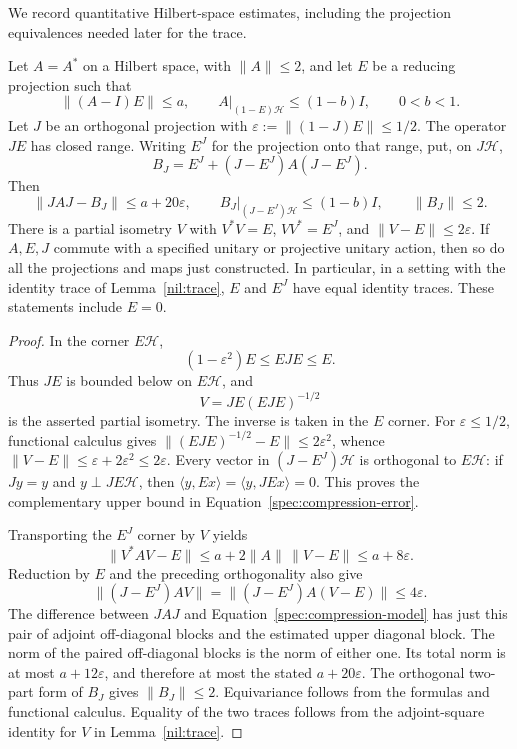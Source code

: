 We record quantitative Hilbert-space estimates, including the projection
equivalences needed later for the trace.

\begin{lemma}
\label{spec:compression}
Let $A=A^*$ on a Hilbert space, with $\|A\|\leq2$, and let $E$ be a
reducing projection such that
\[
 \|(A-I)E\|\leq a,\qquad
 A|_{(1-E)\mathcal H}\leq(1-b)I,\qquad 0<b<1.
\]
Let $J$ be an orthogonal projection with
$\varepsilon:=\|(1-J)E\|\leq1/2$.  The operator $JE$ has closed range.
Writing $E^J$ for the projection onto that range, put, on $J\mathcal H$,
\begin{equation}
 B_J=E^J+(J-E^J)A(J-E^J).
 \label{spec:compression-model}
\end{equation}
Then
\begin{equation}
 \|JAJ-B_J\|\leq a+20\varepsilon,
 \qquad B_J|_{(J-E^J)\mathcal H}\leq(1-b)I,
 \qquad \|B_J\|\leq2.
 \label{spec:compression-error}
\end{equation}
There is a partial isometry $V$ with $V^*V=E$, $VV^*=E^J$, and
$\|V-E\|\leq2\varepsilon$.  If $A,E,J$ commute with a specified unitary
or projective unitary action, then so do all the projections and maps just
constructed.  In particular, in a setting with the identity trace of
Lemma~\ref{nil:trace}, $E$ and $E^J$ have equal identity traces.  These
statements include $E=0$.
\end{lemma}

\begin{proof}
In the corner $E\mathcal H$,
\[
       (1-\varepsilon^2)E\leq EJE\leq E.
\]
Thus $JE$ is bounded below on $E\mathcal H$, and
\[
        V=JE(EJE)^{-1/2}
\]
is the asserted partial isometry.  The inverse is taken in the $E$ corner.
For $\varepsilon\leq1/2$, functional calculus gives
$\|(EJE)^{-1/2}-E\|\leq2\varepsilon^2$, whence
$\|V-E\|\leq\varepsilon+2\varepsilon^2\leq2\varepsilon$.
Every vector in $(J-E^J)\mathcal H$ is orthogonal to $E\mathcal H$:
if $Jy=y$ and $y\perp JE\mathcal H$, then
$\langle y,Ex\rangle=\langle y,JEx\rangle=0$.  This proves the
complementary upper bound in Equation~\eqref{spec:compression-error}.

Transporting the $E^J$ corner by $V$ yields
\[
 \|V^*AV-E\|
 \leq a+2\|A\|\,\|V-E\|
 \leq a+8\varepsilon.
\]
Reduction by $E$ and the preceding orthogonality also give
\[
 \|(J-E^J)AV\|
 =\|(J-E^J)A(V-E)\|\leq4\varepsilon.
\]
The difference between $JAJ$ and Equation~\eqref{spec:compression-model}
has just this pair of adjoint off-diagonal blocks and the estimated upper
diagonal block.  The norm of the paired off-diagonal blocks is the norm
of either one.  Its total norm is at most $a+12\varepsilon$, and therefore
at most the stated $a+20\varepsilon$.  The orthogonal two-part form of
$B_J$ gives $\|B_J\|\leq2$.  Equivariance follows from the formulas and
functional calculus.  Equality of the two traces follows from the
adjoint-square identity for $V$ in Lemma~\ref{nil:trace}.
\end{proof}

